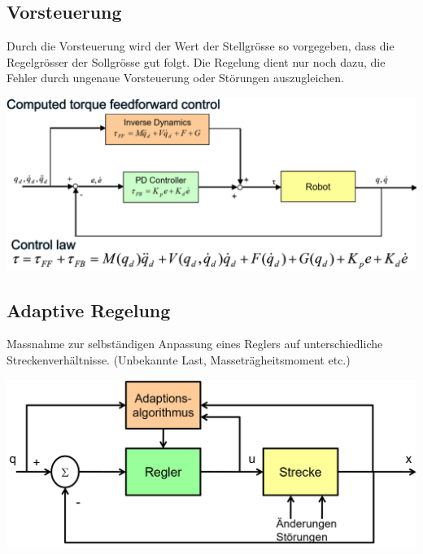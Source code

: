 \begin{minipage}{0.5\linewidth}
    \subsection{Vorsteuerung }
    Durch die Vorsteuerung wird der Wert der Stellgrösse so vorgegeben, dass die Regelgrösser der Sollgrösse gut folgt. Die Regelung dient nur noch dazu, die Fehler durch ungenaue Vorsteuerung oder Störungen auszugleichen.
\end{minipage}
\begin{minipage}{0.5\linewidth}
    \includegraphics[width=\linewidth]{./bilder/Vorsteuerung}
\end{minipage}

\begin{minipage}{0.5\linewidth}
    \subsection{Adaptive Regelung }
    Massnahme zur selbständigen Anpassung eines Reglers auf unterschiedliche Streckenverhältnisse. (Unbekannte Last, Masseträgheitsmoment etc.)
\end{minipage}
\begin{minipage}{0.5\linewidth}
    \includegraphics[width=\linewidth]{./bilder/RegAdap}
\end{minipage}

